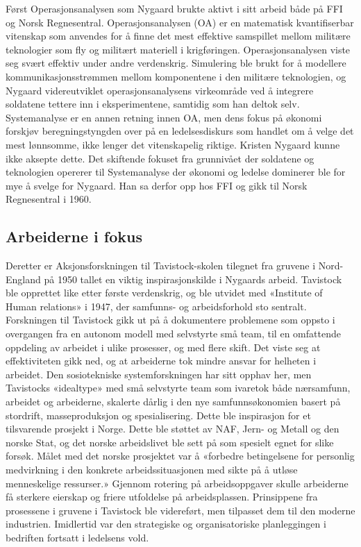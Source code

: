 \documentclass[../main.tex]{subfiles}
\begin{document}
Først Operasjonsanalysen som Nygaard brukte aktivt i sitt arbeid både på FFI og Norsk Regnesentral. Operasjonsanalysen (OA) er en matematisk kvantifiserbar vitenskap som anvendes for å finne det mest effektive samspillet mellom militære teknologier som fly og militært materiell i krigføringen. Operasjonsanalysen viste seg svært effektiv under andre verdenskrig. Simulering ble brukt for å modellere kommunikasjonsstrømmen mellom komponentene i den militære teknologien, og Nygaard videreutviklet operasjonsanalysens virkeområde ved å integrere soldatene tettere inn i eksperimentene, samtidig som han deltok selv. Systemanalyse er en annen retning innen OA, men dens fokus på økonomi forskjøv beregningstyngden over på en ledelsesdiskurs som handlet om å velge det mest lønnsomme, ikke lenger det vitenskapelig riktige. Kristen Nygaard kunne ikke aksepte dette. Det skiftende fokuset fra grunnivået der soldatene og teknologien opererer til Systemanalyse der økonomi og ledelse dominerer ble for mye å svelge for Nygaard. Han sa derfor opp hos FFI og gikk til Norsk Regnesentral i 1960.

\subsection{Arbeiderne i fokus}
Deretter er Aksjonsforskningen til Tavistock-skolen tilegnet fra gruvene i Nord-England på 1950 tallet en viktig inspirasjonskilde i Nygaards arbeid. Tavistock ble opprettet like etter første verdenskrig, og ble utvidet med «Institute of Human relations» i 1947, der samfunns- og arbeidsforhold sto sentralt. Forskningen til Tavistock gikk ut på å dokumentere problemene som oppsto i overgangen fra en autonom modell med selvstyrte små team, til en omfattende oppdeling av arbeidet i ulike prosesser, og med flere skift. Det viste seg at effektiviteten gikk ned, og at arbeiderne tok mindre ansvar for helheten i arbeidet. Den sosiotekniske systemforskningen har sitt opphav her, men Tavistocks «idealtype» med små selvstyrte team som ivaretok både nærsamfunn, arbeidet og arbeiderne, skalerte dårlig i den nye samfunnsøkonomien basert på stordrift, masseproduksjon og spesialisering. Dette ble inspirasjon for et tilsvarende prosjekt i Norge. Dette ble støttet av NAF, Jern- og Metall og den norske Stat, og det norske arbeidslivet ble sett på som spesielt egnet for slike forsøk. Målet med det norske prosjektet var å «forbedre betingelsene for personlig medvirkning i den konkrete arbeidssituasjonen med sikte på å utløse menneskelige ressurser.» Gjennom rotering på arbeidsoppgaver skulle arbeiderne få sterkere eierskap og friere utfoldelse på arbeidsplassen. Prinsippene fra prosessene i gruvene i Tavistock ble videreført, men tilpasset dem til den moderne industrien. Imidlertid var den strategiske og organisatoriske planleggingen i bedriften fortsatt i ledelsens vold.
\end{document}
